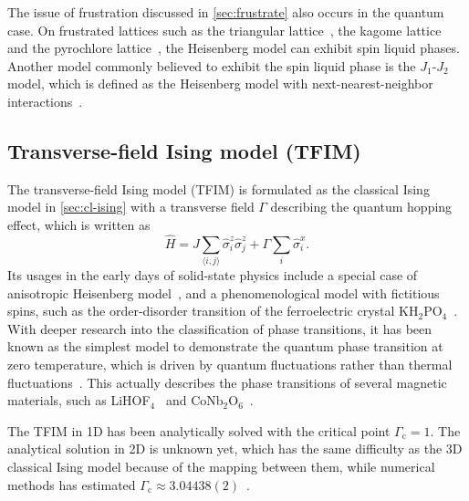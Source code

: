 The issue of frustration discussed in \cref{sec:frustrate} also occurs in the quantum case. On frustrated lattices such as the triangular lattice~\cite{li2015rare}, the kagome lattice~\cite{norman2016colloquium} and the pyrochlore lattice~\cite{moessner1998properties}, the Heisenberg model can exhibit spin liquid phases. Another model commonly believed to exhibit the spin liquid phase is the $J_1$-$J_2$ model, which is defined as the Heisenberg model with next-nearest-neighbor interactions~\cite{dagotto1989phase, schulz1996magnetic, hu2013direct, liu2018gapless}.


\subsection{Transverse-field Ising model (TFIM)}
\label{sec:qu-ising}

The transverse-field Ising model (TFIM) is formulated as the classical Ising model in \cref{sec:cl-ising} with a transverse field $\Gamma$ describing the quantum hopping effect, which is written as
\begin{equation}
\hat{H} = J \sum_{\langle i, j \rangle} \hat{\sigma}^z_i \hat{\sigma}^z_j
+ \Gamma \sum_i \hat{\sigma}^x_i.
\label{eq:qu-ising}
\end{equation}
Its usages in the early days of solid-state physics include a special case of anisotropic Heisenberg model~\cite{katsura1962statistical}, and a phenomenological model with fictitious spins, such as the order-disorder transition of the ferroelectric crystal KH$_2$PO$_4$~\cite{de1963collective}. With deeper research into the classification of phase transitions, it has been known as the simplest model to demonstrate the quantum phase transition at zero temperature, which is driven by quantum fluctuations rather than thermal fluctuations~\cite{sachdev2001quantum, suzuki2012quantum}. This actually describes the phase transitions of several magnetic materials, such as LiHOF$_4$~\cite{bitko1996quantum} and CoNb$_2$O$_6$~\cite{coldea2010quantum}.

The TFIM in 1D has been analytically solved with the critical point $\Gamma_\text{c} = 1$. The analytical solution in 2D is unknown yet, which has the same difficulty as the 3D classical Ising model because of the mapping between them, while numerical methods has estimated $\Gamma_\text{c} \approx 3.04438(2)$~\cite{blote2002cluster}.


